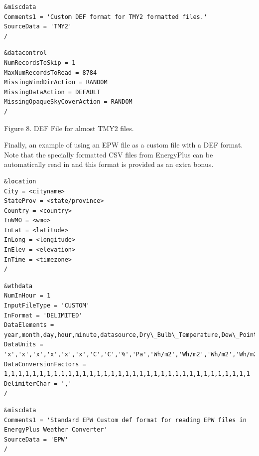 \begin{lstlisting}
&miscdata
Comments1 = 'Custom DEF format for TMY2 formatted files.'
SourceData = 'TMY2'
/
\end{lstlisting}

\begin{lstlisting}
&datacontrol
NumRecordsToSkip = 1
MaxNumRecordsToRead = 8784
MissingWindDirAction = RANDOM
MissingDataAction = DEFAULT
MissingOpaqueSkyCoverAction = RANDOM
/
\end{lstlisting}

Figure 8. DEF File for almost TMY2 files.

Finally, an example of using an EPW file as a custom file with a DEF format. Note that the specially formatted CSV files from EnergyPlus can be automatically read in and this format is provided as an extra bonus.

\begin{lstlisting}
&location
City = <cityname>
StateProv = <state/province>
Country = <country>
InWMO = <wmo>
InLat = <latitude>
InLong = <longitude>
InElev = <elevation>
InTime = <timezone>
/
\end{lstlisting}

\begin{lstlisting}
&wthdata
NumInHour = 1
InputFileType = 'CUSTOM'
InFormat = 'DELIMITED'
DataElements = year,month,day,hour,minute,datasource,Dry\_Bulb\_Temperature,Dew\_Point\_Temperature,Relative\_Humidity,Atmospheric\_Pressure,Extraterrestrial\_Horizontal\_Radiation,Extraterrestrial\_Direct\_Normal\_Radiation,Horizontal\_Infrared\_Radiation\_Intensity\_from\_Sky,Global\_Horizontal\_Radiation,Direct\_Normal\_Radiation,Diffuse\_Horizontal\_Radiation,Global\_Horizontal\_Illuminance,Direct\_Normal\_Illuminance,Diffuse\_Horizontal\_Illuminance,Zenith\_Luminance,Wind\_Direction,Wind\_Speed,Total\_Sky\_Cover,Opaque\_Sky\_Cover,Visibility,Ceiling\_Height,Present\_Weather\_Observation,Present\_Weather\_Codes,Precipitable\_Water,Aerosol\_Optical\_Depth,Snow\_Depth,Days\_Since\_Last\_Snow,Albedo,Liquid\_Precipitation\_Depth,Liquid\_Precipitation\_Quantity
DataUnits = 'x','x','x','x','x','x','C','C','%','Pa','Wh/m2','Wh/m2','Wh/m2','Wh/m2','Wh/m2','Wh/m2','lux','lux','lux','Cd/m2','deg','m/s','tenths','tenths','km','m','x','x','mm','{.001}','cm','x','{.01}','mm','hr'
DataConversionFactors = 1,1,1,1,1,1,1,1,1,1,1,1,1,1,1,1,1,1,1,1,1,1,1,1,1,1,1,1,1,1,1,1,1,1,1
DelimiterChar = ','
/
\end{lstlisting}

\begin{lstlisting}
&miscdata
Comments1 = 'Standard EPW Custom def format for reading EPW files in EnergyPlus Weather Converter'
SourceData = 'EPW'
/
\end{lstlisting}

